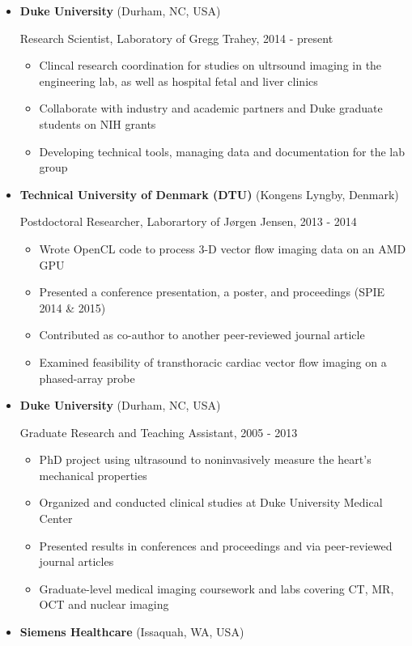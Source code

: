 \documentclass[
]{article}
\providecommand{\tightlist}{%
  \setlength{\itemsep}{0pt}\setlength{\parskip}{0pt}}
\begin{document}
\begin{itemize}
\item
  \textbf{Duke University} (Durham, NC, USA)

  Research Scientist, Laboratory of Gregg Trahey, 2014 - present

  \begin{itemize}
  \tightlist
  \item
    Clincal research coordination for studies on ultrsound imaging in
    the engineering lab, as well as hospital fetal and liver clinics
  \item
    Collaborate with industry and academic partners and Duke graduate
    students on NIH grants
  \item
    Developing technical tools, managing data and documentation for the
    lab group
  \end{itemize}
\item
  \textbf{Technical University of Denmark (DTU)} (Kongens Lyngby,
  Denmark)

  Postdoctoral Researcher, Laborartory of Jørgen Jensen, 2013 - 2014

  \begin{itemize}
  \tightlist
  \item
    Wrote OpenCL code to process 3-D vector flow imaging data on an AMD
    GPU
  \item
    Presented a conference presentation, a poster, and proceedings (SPIE
    2014 \& 2015)
  \item
    Contributed as co-author to another peer-reviewed journal article
  \item
    Examined feasibility of transthoracic cardiac vector flow imaging on
    a phased-array probe
  \end{itemize}
\item
  \textbf{Duke University} (Durham, NC, USA)

  Graduate Research and Teaching Assistant, 2005 - 2013

  \begin{itemize}
  \tightlist
  \item
    PhD project using ultrasound to noninvasively measure the heart's
    mechanical properties
  \item
    Organized and conducted clinical studies at Duke University Medical
    Center
  \item
    Presented results in conferences and proceedings and via
    peer-reviewed journal articles
  \item
    Graduate-level medical imaging coursework and labs covering CT, MR,
    OCT and nuclear imaging
  \end{itemize}
\item
  \textbf{Siemens Healthcare} (Issaquah, WA, USA)


\end{itemize}
\end{document}
